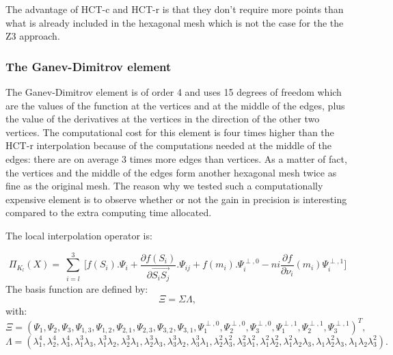 \documentclass[proc]{edpsmath}
\begin{document}
The advantage of HCT-c and HCT-r is that they don't require more points than what is already included in the hexagonal mesh which is not the case for the the Z3 approach.

\subsubsection{The Ganev-Dimitrov element}
\label{subsubsec:ganevdimitrov}
The Ganev-Dimitrov element is of order 4 and uses 15 degrees of freedom which are the values of the function at the vertices and at the middle of the edges, plus the value of the derivatives at the vertices in the direction of the other two vertices. 
The computational cost for this element is four times higher than the HCT-r interpolation because of the computations needed at the middle of the edges: there are on average 3 times more edges than vertices. As a matter of fact, the vertices and the middle of the edges form another hexagonal mesh twice as fine as the original mesh. The reason why we tested such a computationally expensive element is to observe whether or not the gain in precision is interesting compared to the extra computing time allocated. 

\noindent The local interpolation operator is:

\begin{equation*}
 \Pi_{K_l} (X) = \sum \limits_{\substack{i=l }}^{3}{ [f(S_i).\Psi_i +  \frac{\partial f(S_i)}{\partial  \overrightarrow{ S_i S_j } }.\Psi_{ij} } + f(m_i).\Psi^{\perp,0}_i  - ni \frac{\partial f}{\partial \nu_i}(m_i) \Psi^{\perp,1}_i] 
\end{equation*}
\noindent The basis function are defined by: 
\begin{equation*}
\Xi =  \Sigma \Lambda,
\end{equation*} 
 \noindent with:\\
\begin{equation*}
\Xi=(\Psi_1, \Psi_2, \Psi_3, \Psi_{1,3},\Psi_{1,2},\Psi_{2,1},\Psi_{2,3} ,\Psi_{3,2},\Psi_{3,1},\Psi_1^{\perp,0} ,\Psi_2^{\perp,0},\Psi_3^{\perp,0},\Psi_1^{\perp,1},\Psi_2^{\perp,1},\Psi_3^{\perp,1})^T,
\end{equation*} 
\begin{equation*}
\Lambda = ( \lambda_1^4,\lambda_2^4,\lambda_3^4,\lambda_1^3\lambda_3,\lambda_1^3\lambda_2,\lambda_2^3\lambda_1,\lambda_2^3\lambda_3 ,\lambda_3^3\lambda_2,\lambda_3^3\lambda_1,\lambda_2^2\lambda_3^2,\lambda_3^2\lambda_1^2,\lambda_1^2\lambda_2^2,\lambda_1^2\lambda_2\lambda_3,\lambda_1\lambda_2^2\lambda_3,\lambda_1\lambda_2\lambda_3^2).
\end{equation*} 
  
\end{document}
